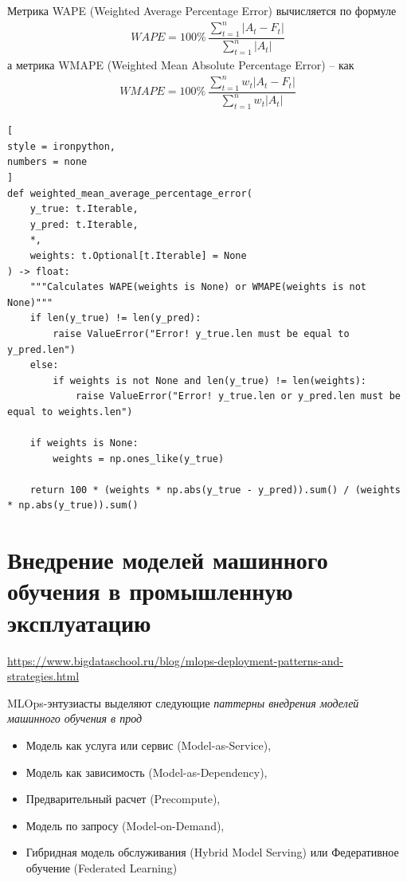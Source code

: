 \documentclass[%
	11pt,
	a4paper,
	utf8,
		]{article}
\begin{document}
Метрика WAPE (Weighted Average Percentage Error) вычисляется по формуле
\begin{align*}
	WAPE = 100\% \, \dfrac{ \sum\limits_{t=1}^{n} |A_t - F_t| }{ \sum\limits_{t=1}^{n} |A_t|}
\end{align*}
а метрика WMAPE (Weighted Mean Absolute Percentage Error) -- как
\begin{align*}
	WMAPE = 100\% \, \dfrac{ \sum\limits_{t=1}^{n} w_t |A_t - F_t| }{ \sum\limits_{t=1}^{n} w_t |A_t|}
\end{align*}
\begin{lstlisting}[
style = ironpython,
numbers = none
]
def weighted_mean_average_percentage_error(
    y_true: t.Iterable,
    y_pred: t.Iterable,
    *,
    weights: t.Optional[t.Iterable] = None
) -> float:
    """Calculates WAPE(weights is None) or WMAPE(weights is not None)"""
    if len(y_true) != len(y_pred):
        raise ValueError("Error! y_true.len must be equal to y_pred.len")
    else:
        if weights is not None and len(y_true) != len(weights):
            raise ValueError("Error! y_true.len or y_pred.len must be equal to weights.len")
    
    if weights is None:
        weights = np.ones_like(y_true)
    
    return 100 * (weights * np.abs(y_true - y_pred)).sum() / (weights * np.abs(y_true)).sum()
\end{lstlisting}



\section{Внедрение моделей машинного обучения в промышленную эксплуатацию}

\url{https://www.bigdataschool.ru/blog/mlops-deployment-patterns-and-strategies.html}

MLOps-энтузиасты выделяют следующие \emph{паттерны внедрения моделей машинного обучения в прод}
\begin{itemize}
	\item Модель как услуга или сервис (Model-as-Service),
	
	\item Модель как зависимость (Model-as-Dependency),
	
	\item Предварительный расчет (Precompute),
	
	\item Модель по запросу (Model-on-Demand),
	
	\item Гибридная модель обслуживания (Hybrid Model Serving) или Федеративное обучение (Federated Learning)
\end{itemize}
\end{document}
